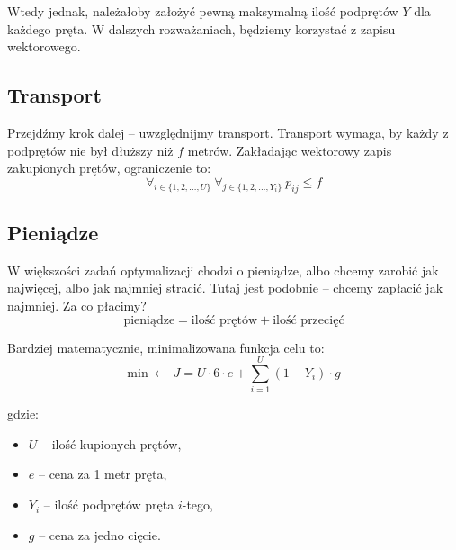 \documentclass[11pt]{article}
\begin{document}
{Wtedy jednak, należałoby założyć pewną maksymalną ilość podprętów $Y$ dla każdego pręta. W dalszych rozważaniach, będziemy korzystać z zapisu wektorowego.

\newpage

\subsection{Transport}

Przejdźmy krok dalej -- uwzględnijmy transport. Transport wymaga, by każdy z podprętów nie był dłuższy niż $f$ metrów. Zakładając wektorowy zapis zakupionych prętów, ograniczenie to:
\begin{equation*}
\forall_{i \in \{1, 2, \ldots, U\}} \
\forall_{j \in \{1, 2, \ldots, Y_i\}} \
p_{ij} \le f
\end{equation*}

\subsection{Pieniądze}

W większości zadań optymalizacji chodzi o pieniądze, albo chcemy zarobić jak najwięcej, albo jak najmniej stracić. Tutaj jest podobnie -- chcemy zapłacić jak najmniej. Za co płacimy?
\begin{equation*}
\text{pieniądze} = \text{ilość prętów} + \text{ilość przecięć}
\end{equation*}

Bardziej matematycznie, minimalizowana funkcja celu to:
\begin{equation*}
\text{min} \ \leftarrow \ J = U \cdot 6 \cdot e + \sum_{i = 1}^{U} (1 - Y_i) \cdot g
\end{equation*}

gdzie:
\begin{itemize}[ ]
\item $U$ -- ilość kupionych prętów,
\item $e$ -- cena za 1 metr pręta,
\item $Y_i$ -- ilość podprętów pręta $i$-tego,
\item $g$ -- cena za jedno cięcie.
\end{itemize}

\newpage
}{}
\end{document}
